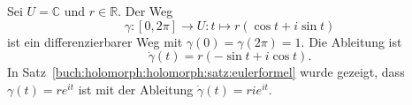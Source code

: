 \begin{beispiel}
\label{buch:integration:wege:bsp:kreis}
Sei $U=\mathbb{C}$ und $r\in\mathbb{R}$.
Der Weg
\[
\gamma
\colon
[0,2\pi]
\to
U
:
t
\mapsto
r(\cos t + i\sin t)
\]
ist ein differenzierbarer Weg mit $\gamma(0) = \gamma(2\pi) = 1$.
Die Ableitung ist
\[
\dot{\gamma}(t)
=
r(-\sin t + i\cos t).
\]
In Satz~\ref{buch:holomorph:holomorph:satz:eulerformel}
wurde gezeigt, dass $\gamma(t) = re^{it}$ ist mit der Ableitung
$\dot{\gamma}(t)=rie^{it}$.
\end{beispiel}
